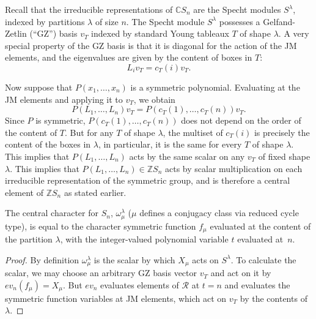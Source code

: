 Recall that the irreducible representations of $\mathbb{C}S_n$ are the Specht modules $S^\lambda$, indexed by partitions $\lambda$ of size $n$. The Specht module $S^\lambda$ possesses a Gelfand-Zetlin (``GZ'') basis $v_T$ indexed by standard Young tableaux $T$ of shape $\lambda$. A very special property of the GZ basis is that it is diagonal for the action of the JM elements, and the eigenvalues are given by the content of boxes in $T$:
\[
L_i v_T = c_T(i) v_T.
\]

Now suppose that $P(x_1, \ldots, x_n)$ is a symmetric polynomial. Evaluating at the JM elements and applying it to $v_T$, we obtain
\[
P(L_1, \ldots, L_n)v_T = P(c_T(1), \ldots, c_T(n))v_T.
\]
Since $P$ is symmetric, $P(c_T(1), \ldots, c_T(n))$ does not depend on the order of the content of $T$. But for any $T$ of shape $\lambda$, the multiset of $c_T(i)$ is precisely the content of the boxes in $\lambda$, in particular, it is the same for every $T$ of shape $\lambda$. This implies that $P(L_1, \ldots, L_n)$ acts by the same scalar on any $v_T$ of fixed shape $\lambda$. This implies that $P(L_1, \ldots, L_n) \in \mathbb{Z}S_n$ acts by scalar multiplication on each irreducible representation of the symmetric group, and is therefore a central element of $\mathbb{Z}S_n$ as stated earlier.

\begin{theorem} \label{sym_gp_eval_thm}
The central character for $S_n$, $\omega_\mu^\lambda$ \textup{(}$\mu$ defines a conjugacy class via reduced cycle type\textup{)}, is equal to the character symmetric function $f_\mu$ evaluated at the content of the partition $\lambda$, with the integer-valued polynomial variable $t$ evaluated at~$n$.
\end{theorem}
\begin{proof}
By definition $\omega_\mu^\lambda$ is the scalar by which $X_\mu$ acts on $S^\lambda$. To calculate the scalar, we may choose an arbitrary GZ basis vector $v_T$ and act on it by $ev_n(f_\mu) = X_\mu$. But $ev_n$ evaluates elements of $\mathcal{R}$ at $t=n$ and evaluates the symmetric function variables at JM elements, which act on $v_T$ by the contents of $\lambda$.
\end{proof}

